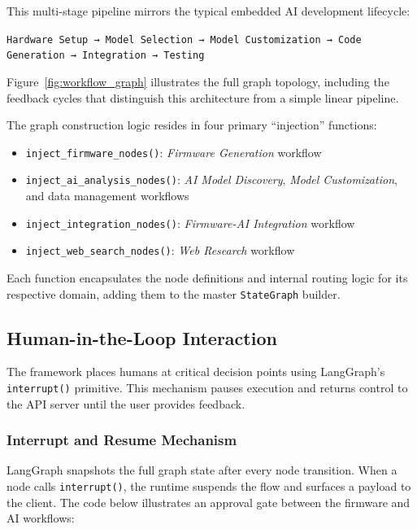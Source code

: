 This multi-stage pipeline mirrors the typical embedded AI development lifecycle:

\begin{center}
    \texttt{Hardware Setup → Model Selection → Model Customization → Code Generation → Integration → Testing}
\end{center}

\noindent Figure~\ref{fig:workflow_graph} illustrates the full graph topology, including the feedback cycles that distinguish this architecture from a simple linear pipeline.


The graph construction logic resides in four primary ``injection'' functions:

\begin{itemize}
    \item \texttt{inject\_\allowbreak firmware\_\allowbreak nodes()}: \textit{Firmware Generation} workflow
    \item \texttt{inject\_\allowbreak ai\_\allowbreak analysis\_\allowbreak nodes()}: \textit{AI Model Discovery}, \textit{Model Customization}, and data management workflows
    \item \texttt{inject\_\allowbreak integration\_\allowbreak nodes()}: \textit{Firmware-AI Integration} workflow
    \item \texttt{inject\_\allowbreak web\_\allowbreak search\_\allowbreak nodes()}: \textit{Web Research} workflow
\end{itemize}

Each function encapsulates the node definitions and internal routing logic for its respective domain, adding them to the master \texttt{StateGraph} builder.

\subsection{Human-in-the-Loop Interaction}
\label{sec:hitl_interaction}

The framework places humans at critical decision points using LangGraph's \texttt{interrupt()} primitive. This mechanism pauses execution and returns control to the API server until the user provides feedback.

\subsubsection{Interrupt and Resume Mechanism}

LangGraph snapshots the full graph state after every node transition. When a node calls \texttt{interrupt()}, the runtime suspends the flow and surfaces a payload to the client. The code below illustrates an approval gate between the firmware and AI workflows:

